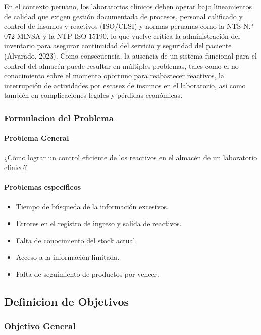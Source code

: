 \documentclass[12pt]{article} %
\begin{document}
En el contexto peruano, los laboratorios clínicos deben operar bajo lineamientos de calidad que exigen gestión documentada de procesos, personal calificado y control de insumos y reactivos (ISO/CLSI) y normas peruanas como la NTS N.° 072-MINSA y la NTP-ISO 15190, lo que vuelve crítica la administración del inventario para asegurar continuidad del servicio y seguridad del paciente (Alvarado, 2023). Como consecuencia, la ausencia de un sistema funcional para el control del almacén puede resultar en múltiples problemas, tales como el no conocimiento sobre el momento oportuno para reabastecer reactivos, la interrupción de actividades por escasez de insumos en el laboratorio, así como también en complicaciones legales y pérdidas económicas.

\subsubsection{Formulacion del Problema}

\paragraph{Problema General}%

¿Cómo lograr un control eficiente de los reactivos en el almacén de un laboratorio clínico?

\paragraph{Problemas especificos}

\begin{itemize}
    \item Tiempo de búsqueda de la información excesivos.
    \item Errores en el registro de ingreso y salida de reactivos.
    \item Falta de conocimiento del stock actual.
    \item Acceso a la información limitada.
    \item Falta de seguimiento de productos por vencer.
\end{itemize}

\subsection{Definicion de Objetivos}

\subsubsection{Objetivo General}
\end{document}
